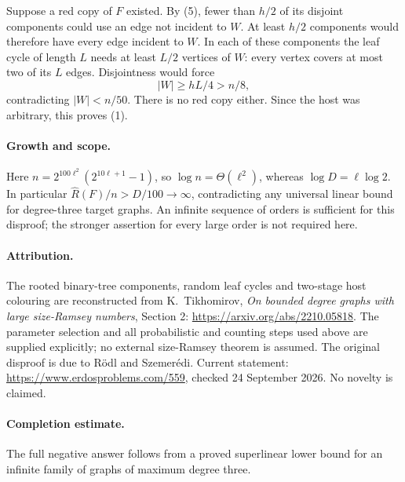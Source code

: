 Suppose a red copy of \(F\) existed. By (5), fewer than \(h/2\)
of its disjoint components could use an edge not incident to \(W\).
At least \(h/2\) components would therefore have every edge incident
to \(W\). In each of these components the leaf cycle of length
\(L\) needs at least \(L/2\) vertices of \(W\): every vertex
covers at most two of its \(L\) edges.
Disjointness would force
\[
 |W|\geq hL/4>n/8,
\]
contradicting \(|W|<n/50\). There is no red copy either.
Since the host was arbitrary, this proves (1).

\paragraph{Growth and scope.}
Here \(n=2^{100\ell^2}(2^{10\ell+1}-1)\), so
\(\log n=\Theta(\ell^2)\), whereas \(\log D=\ell\log2\).
In particular \(\widehat R(F)/n>D/100\to\infty\), contradicting
any universal linear bound for degree-three target graphs.
An infinite sequence of orders is sufficient for this disproof;
the stronger assertion for every large order is not required here.

\paragraph{Attribution.}
The rooted binary-tree components, random leaf cycles and two-stage
host colouring are reconstructed from K.~Tikhomirov,
\emph{On bounded degree graphs with large size-Ramsey numbers},
Section 2: \url{https://arxiv.org/abs/2210.05818}.
The parameter selection and all probabilistic and counting steps
used above are supplied explicitly; no external size-Ramsey theorem
is assumed. The original disproof is due to R\"odl and Szemer\'edi.
Current statement: \url{https://www.erdosproblems.com/559},
checked 24 September 2026. No novelty is claimed.

\paragraph{Completion estimate.}
The full negative answer follows from a proved superlinear lower bound
for an infinite family of graphs of maximum degree three.
